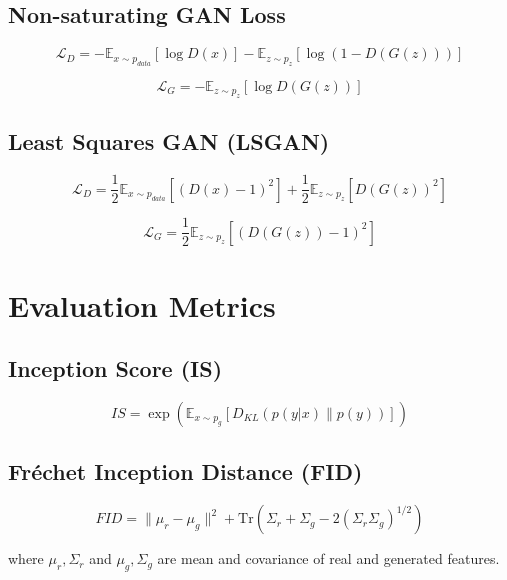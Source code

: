 \documentclass[12pt,a4paper]{article}
\begin{document}
\subsection{Non-saturating GAN Loss}

\begin{equation}
\mathcal{L}_D = -\mathbb{E}_{x \sim p_{data}}[\log D(x)] - \mathbb{E}_{z \sim p_z}[\log(1 - D(G(z)))]
\end{equation}

\begin{equation}
\mathcal{L}_G = -\mathbb{E}_{z \sim p_z}[\log D(G(z))]
\end{equation}

\subsection{Least Squares GAN (LSGAN)}

\begin{equation}
\mathcal{L}_D = \frac{1}{2}\mathbb{E}_{x \sim p_{data}}[(D(x) - 1)^2] + \frac{1}{2}\mathbb{E}_{z \sim p_z}[D(G(z))^2]
\end{equation}

\begin{equation}
\mathcal{L}_G = \frac{1}{2}\mathbb{E}_{z \sim p_z}[(D(G(z)) - 1)^2]
\end{equation}

\section{Evaluation Metrics}

\subsection{Inception Score (IS)}

\begin{equation}
IS = \exp(\mathbb{E}_{x \sim p_g}[D_{KL}(p(y|x) \| p(y))])
\end{equation}

\subsection{Fréchet Inception Distance (FID)}

\begin{equation}
FID = \|\mu_r - \mu_g\|^2 + \text{Tr}(\Sigma_r + \Sigma_g - 2(\Sigma_r \Sigma_g)^{1/2})
\end{equation}

where $\mu_r, \Sigma_r$ and $\mu_g, \Sigma_g$ are mean and covariance of real and generated features.
\end{document}
